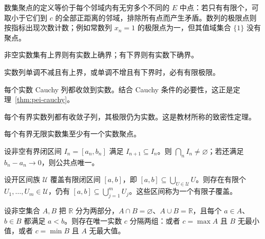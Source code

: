 数集聚点的定义等价于每个邻域内有无穷多个不同的 $E$ 中点：若只有有限个，可取小于它们到 $c$ 的全部正距离的邻域，排除所有点而产生矛盾。数列的极限点则按指标出现次数计数；例如常数列 $x_n=1$ 的极限点为一，但其值域集合 $\{1\}$ 没有聚点。

\begin{theorem}[确界定理]
\label{thm:pei-supremum}
非空实数集有上界则有实数上确界；有下界则有实数下确界。
\end{theorem}

\begin{theorem}[单调有界定理]
\label{thm:pei-completeness-monotone}
实数列单调不减且有上界，或单调不增且有下界时，必有有限极限。
\end{theorem}

\begin{theorem}[基本列收敛定理]
\label{thm:pei-completeness-cauchy}
每个实数 Cauchy 列都收敛到实数。结合 Cauchy 条件的必要性，这正是定理~\ref{thm:pei-cauchy}。
\end{theorem}

\begin{theorem}
\label{thm:pei-bolzano-weierstrass}
每个有界实数列都有收敛子列，其极限仍为实数。这是教材所称的致密性定理。
\end{theorem}

\begin{theorem}[聚点原理]
\label{thm:pei-accumulation}
每个有界无限实数集至少有一个实数聚点。
\end{theorem}

\begin{theorem}[闭区间套定理]
\label{thm:pei-nested-intervals}
设非空有界闭区间 $I_n=[a_n,b_n]$ 满足 $I_{n+1}\subseteq I_n$。则 $\bigcap_nI_n\ne\varnothing$；若还满足 $b_n-a_n\to0$，则公共点唯一。
\end{theorem}

\begin{theorem}[有限覆盖定理]
\label{thm:pei-finite-cover}
设开区间族 $\mathcal{U}$ 覆盖有限闭区间 $[a,b]$，即 $[a,b]\subseteq\bigcup_{U\in\mathcal{U}}U$。则存在有限个 $U_1,\ldots,U_m\in\mathcal{U}$，仍有 $[a,b]\subseteq\bigcup_{j=1}^mU_j$。这些区间称为一个有限子覆盖。
\end{theorem}

\begin{theorem}
\label{thm:pei-dedekind}
设非空集合 $A,B$ 把 $\mathbb{R}$ 分为两部分，$A\cap B=\varnothing$、$A\cup B=\mathbb{R}$，且每个 $a\in A$、$b\in B$ 都满足 $a<b$。则存在唯一实数 $c$ 分隔两组：或者 $c=\max A$ 且 $B$ 无最小值，或者 $c=\min B$ 且 $A$ 无最大值。
\end{theorem}

